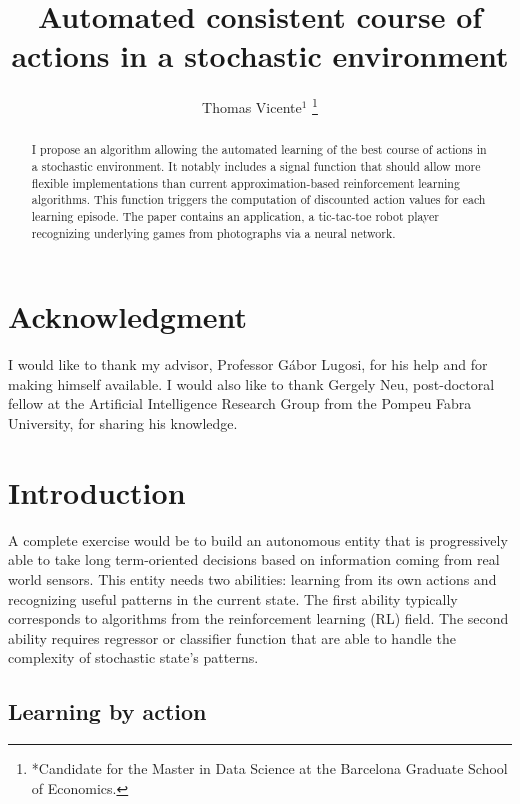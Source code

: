 \documentclass[letterpaper, 10.5 pt, conference]{ieeeconf}
\title{\LARGE \bf
Automated consistent course of actions in a stochastic environment
}
\author{Thomas Vicente$^{1}$%
\thanks{*Candidate for the Master in Data Science at the Barcelona Graduate School of Economics.}%
}
\begin{document}
\maketitle
\thispagestyle{empty}
\pagestyle{empty}

\begin{abstract}

I propose an algorithm allowing the automated learning of the best course of actions in a stochastic environment. It notably includes a signal function that should allow more flexible implementations than current approximation-based reinforcement learning algorithms. This function triggers the computation of discounted action values for each learning episode. The paper contains an application, a tic-tac-toe robot player recognizing underlying games from photographs via a neural network.

\end{abstract}

\section*{Acknowledgment}

I would like to thank my advisor, Professor Gábor Lugosi, for his help and for making himself available. I would also like to thank Gergely Neu, post-doctoral fellow at the Artificial Intelligence Research Group from the Pompeu Fabra University, for sharing his knowledge.

\section{Introduction}

A complete exercise would be to build an autonomous entity that is progressively able to take long term-oriented decisions based on information coming from real world sensors. This entity needs two abilities: learning from its own actions and recognizing useful patterns in the current state. The first ability typically corresponds to algorithms from the reinforcement learning (RL) field. The second ability requires regressor or classifier function that are able to handle the complexity of stochastic state's patterns. 

\subsection{Learning by action}
\end{document}
